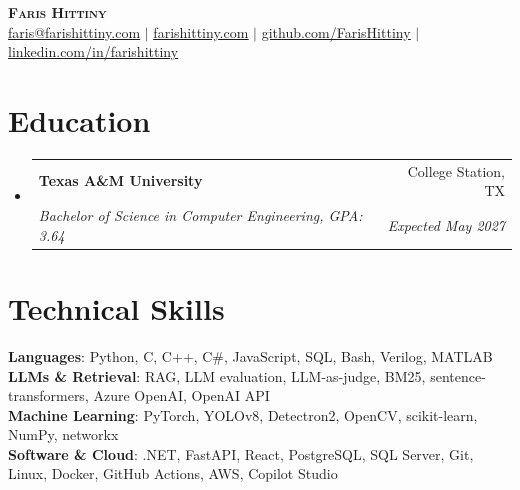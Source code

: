 \documentclass[letterpaper,11pt]{article}
\makeatletter
\newcommand{\resumeSubheading}[4]{
  \vspace{-2pt}\item
    \begin{tabular*}{0.97\textwidth}[t]{l@{\extracolsep{\fill}}r}
      \textbf{#1} & #2 \\
      \textit{\small#3} & \textit{\small #4} \\
    \end{tabular*}\vspace{-7pt}
}
\newcommand{\resumeSubHeadingListStart}{\begin{itemize}[leftmargin=0.15in, label={}]}
\newcommand{\resumeSubHeadingListEnd}{\end{itemize}}
\makeatother
\begin{document}
\begin{center}
    \textbf{\Huge \scshape Faris Hittiny} \\ \vspace{1pt}
    \small \href{mailto:faris@farishittiny.com}{\underline{faris@farishittiny.com}} $|$
    \href{https://farishittiny.com}{\underline{farishittiny.com}} $|$
    \href{https://github.com/FarisHittiny}{\underline{github.com/FarisHittiny}} $|$
    \href{https://linkedin.com/in/farishittiny}{\underline{linkedin.com/in/farishittiny}}
\end{center}

\section{Education}
  \resumeSubHeadingListStart
    \resumeSubheading
      {Texas A\&M University}{College Station, TX}
      {Bachelor of Science in Computer Engineering, GPA: 3.64}{Expected May 2027}
  \resumeSubHeadingListEnd

\section{Technical Skills}
 \begin{itemize}[leftmargin=0.15in, label={}]
    \small{\item{
     \textbf{Languages}{: Python, C, C++, C\#, JavaScript, SQL, Bash, Verilog, MATLAB} \\
     \textbf{LLMs \& Retrieval}{: RAG, LLM evaluation, LLM-as-judge, BM25, sentence-transformers, Azure OpenAI, OpenAI API} \\
     \textbf{Machine Learning}{: PyTorch, YOLOv8, Detectron2, OpenCV, scikit-learn, NumPy, networkx} \\
     \textbf{Software \& Cloud}{: .NET, FastAPI, React, PostgreSQL, SQL Server, Git, Linux, Docker, GitHub Actions, AWS, Copilot Studio}
    }}
 \end{itemize}
\end{document}
